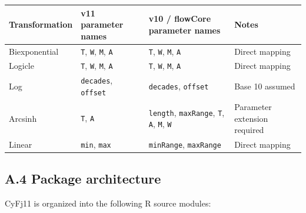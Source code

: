 \documentclass[
]{article}
\begin{document}
\begin{longtable}[]{@{}
  >{\raggedright\arraybackslash}p{}
  >{\raggedright\arraybackslash}p{}
  >{\raggedright\arraybackslash}p{}
  >{\raggedright\arraybackslash}p{}@{}}
\toprule\noalign{}
\begin{minipage}[b]{\linewidth}\raggedright
Transformation
\end{minipage} & \begin{minipage}[b]{\linewidth}\raggedright
v11 parameter names
\end{minipage} & \begin{minipage}[b]{\linewidth}\raggedright
v10 / flowCore parameter names
\end{minipage} & \begin{minipage}[b]{\linewidth}\raggedright
Notes
\end{minipage} \\
\midrule\noalign{}
\endhead
\bottomrule\noalign{}
\endlastfoot
Biexponential & \texttt{T}, \texttt{W}, \texttt{M}, \texttt{A} &
\texttt{T}, \texttt{W}, \texttt{M}, \texttt{A} & Direct mapping \\
Logicle & \texttt{T}, \texttt{W}, \texttt{M}, \texttt{A} & \texttt{T},
\texttt{W}, \texttt{M}, \texttt{A} & Direct mapping \\
Log & \texttt{decades}, \texttt{offset} & \texttt{decades},
\texttt{offset} & Base 10 assumed \\
Arcsinh & \texttt{T}, \texttt{A} & \texttt{length}, \texttt{maxRange},
\texttt{T}, \texttt{A}, \texttt{M}, \texttt{W} & Parameter extension
required \\
Linear & \texttt{min}, \texttt{max} & \texttt{minRange},
\texttt{maxRange} & Direct mapping \\
\end{longtable}

\subsection{A.4 Package architecture}\label{a.4-package-architecture}

CyFj11 is organized into the following R source modules:
\end{document}
